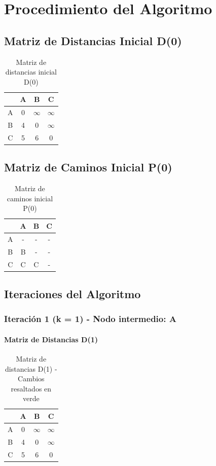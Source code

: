 \documentclass[12pt]{article}
\begin{document}
\clearpage
\section{Procedimiento del Algoritmo}
\subsection{Matriz de Distancias Inicial D(0)}
\begin{table}[h!]
\centering
\begin{tabular}{|c|c|c|c|}
\hline
 & A & B & C \\\hline
A & 0 & $\infty$ & $\infty$ \\\hline
B & 4 & 0 & $\infty$ \\\hline
C & 5 & 6 & 0 \\\hline
\end{tabular}
\caption{Matriz de distancias inicial D(0)}
\end{table}

\clearpage
\subsection{Matriz de Caminos Inicial P(0)}
\begin{table}[h!]
\centering
\begin{tabular}{|c|c|c|c|}
\hline
 & A & B & C \\\hline
A & - & - & - \\\hline
B & B & - & - \\\hline
C & C & C & - \\\hline
\end{tabular}
\caption{Matriz de caminos inicial P(0)}
\end{table}

\clearpage
\subsection{Iteraciones del Algoritmo}
\subsubsection{Iteración 1 (k = 1) - Nodo intermedio: A}
\paragraph{Matriz de Distancias D(1)}
\begin{table}[h!]
\centering
\begin{tabular}{|c|c|c|c|}
\hline
 & A & B & C \\\hline
A & 0 & $\infty$ & $\infty$ \\\hline
B & 4 & 0 & $\infty$ \\\hline
C & 5 & 6 & 0 \\\hline
\end{tabular}
\caption{Matriz de distancias D(1) - Cambios resaltados en verde}
\end{table}
\end{document}
